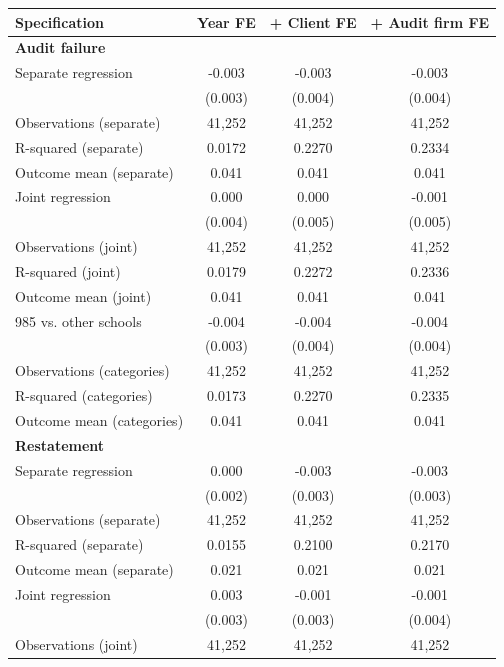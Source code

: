 \documentclass[10pt]{article}
\begin{document}
\begin{minipage}{19cm}\fontsize{10}{12}\selectfont\setlength{\tabcolsep}{4pt}\renewcommand{\arraystretch}{1.12}


\centering
{}
\begin{threeparttable}
\begin{tabular}{p{}ccc}
\toprule
Specification & Year FE & + Client FE & + Audit firm FE \\
\midrule
\multicolumn{4}{l}{\textbf{Audit failure}} \\
Separate regression & -0.003 & -0.003 & -0.003 \\
 & (0.003) & (0.004) & (0.004) \\
Observations (separate) & 41,252 & 41,252 & 41,252 \\
R-squared (separate) & 0.0172 & 0.2270 & 0.2334 \\
Outcome mean (separate) & 0.041 & 0.041 & 0.041 \\
Joint regression & 0.000 & 0.000 & -0.001 \\
 & (0.004) & (0.005) & (0.005) \\
Observations (joint) & 41,252 & 41,252 & 41,252 \\
R-squared (joint) & 0.0179 & 0.2272 & 0.2336 \\
Outcome mean (joint) & 0.041 & 0.041 & 0.041 \\
985 vs. other schools & -0.004 & -0.004 & -0.004 \\
 & (0.003) & (0.004) & (0.004) \\
Observations (categories) & 41,252 & 41,252 & 41,252 \\
R-squared (categories) & 0.0173 & 0.2270 & 0.2335 \\
Outcome mean (categories) & 0.041 & 0.041 & 0.041 \\
\multicolumn{4}{l}{\textbf{Restatement}} \\
Separate regression & 0.000 & -0.003 & -0.003 \\
 & (0.002) & (0.003) & (0.003) \\
Observations (separate) & 41,252 & 41,252 & 41,252 \\
R-squared (separate) & 0.0155 & 0.2100 & 0.2170 \\
Outcome mean (separate) & 0.021 & 0.021 & 0.021 \\
Joint regression & 0.003 & -0.001 & -0.001 \\
 & (0.003) & (0.003) & (0.004) \\
Observations (joint) & 41,252 & 41,252 & 41,252 \\

\end{tabular}
\end{threeparttable}
\end{minipage}
\end{document}
